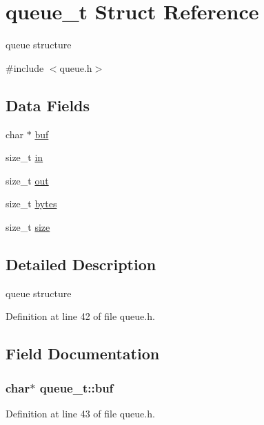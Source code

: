 \hypertarget{structqueue__t}{}\section{queue\+\_\+t Struct Reference}
\label{structqueue__t}


queue structure  




{\ttfamily \#include $<$queue.\+h$>$}

\subsection*{Data Fields}
\begin{DoxyCompactItemize}
\item 
char $\ast$ \hyperlink{structqueue__t_aaee81421d150a17123a2b858d5b1685d}{buf}
\item 
size\+\_\+t \hyperlink{structqueue__t_a7a6832e36c70a1db7fddc93fb6be9d63}{in}
\item 
size\+\_\+t \hyperlink{structqueue__t_a8f6e1c623d2ceed398a71a0aab93b0fa}{out}
\item 
size\+\_\+t \hyperlink{structqueue__t_a58398d4ee60bc90ffba2bc3488fe185b}{bytes}
\item 
size\+\_\+t \hyperlink{structqueue__t_a83a13b888f9d4ef127d706559818b779}{size}
\end{DoxyCompactItemize}


\subsection{Detailed Description}
queue structure 

Definition at line 42 of file queue.\+h.



\subsection{Field Documentation}
\subsubsection[{\texorpdfstring{buf}{buf}}]{\setlength{\rightskip}{0pt plus 5cm}char$\ast$ queue\+\_\+t\+::buf}\hypertarget{structqueue__t_aaee81421d150a17123a2b858d5b1685d}{}\label{structqueue__t_aaee81421d150a17123a2b858d5b1685d}


Definition at line 43 of file queue.\+h.



